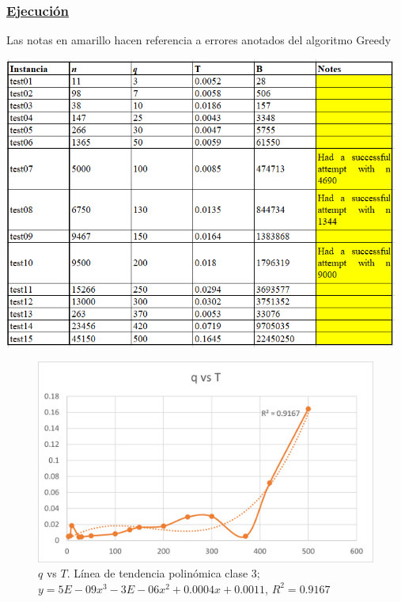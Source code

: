 \documentclass[12pt,letterpaper, titlepage, onecolumn]{article}
\begin{document}
		\subsubsection{\underline{Ejecución}}
			\par *Las notas en amarillo hacen referencia a errores anotados del algoritmo Greedy\\
			\par \includegraphics[width=130mm]{img/TablaDP.png}
			\begin{figure}[!]				
				\centering
				\includegraphics{img/DP_qvsT.png}
				\caption{$q$ vs $T$. Línea de tendencia polinómica clase 3; $y = 5E-09x^3 - 3E-06x^2 + 0.0004x + 0.0011
				$, $R^2 = 0.9167$}
			\end{figure}
\end{document}

